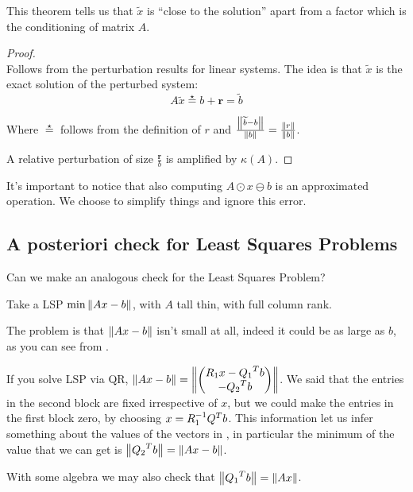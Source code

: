 \documentclass[ComputationalMathematics.tex]{subfiles}
\begin{document}
This theorem tells us that $\widetilde{x}$ is ``close to the solution'' apart from a factor which is the conditioning of matrix $A$.

\begin{proof}~\\
Follows from the perturbation results for linear systems. The idea is that $\widetilde{x}$ is the exact solution of the perturbed system:
\[
  A\widetilde{x} \stareq b + \mathbf{r} = \widetilde{b}
\]

Where $\stareq$ follows from the definition of $r$ and $\frac{\left\lVert\widetilde{b} - b\right\rVert}{\left\lVert b\right\rVert} = \frac{\left\lVert r\right\rVert}{\left\lVert b\right\rVert}$.

  A relative perturbation of size $\frac{\mathbf{r}}{b}$ is amplified by $\kappa(A)$.
\end{proof}

It's important to notice that also computing $A \odot x \ominus b$ is an approximated operation. We choose to simplify things and ignore this error.

\subsection{A posteriori check for Least Squares Problems}
Can we make an analogous check for the Least Squares Problem?

  Take a LSP $\min \left\lVert Ax-b\right\rVert$, with $A$ tall thin, with full column rank.

  The problem is that $\left\lVert Ax - b\right\rVert$ isn't small at all, indeed it could be as large as $b$, as you can see from .


  \begin{obs}
    If you solve LSP via QR, $\left\lVert Ax - b\right\rVert = \left\lVert\begin{pmatrix} 
    R_1 x - {Q_1}^{T}b\\ -{Q_2}^{T} b \end{pmatrix}\right\rVert$. We said that the entries in the second block are fixed irrespective of $x$, but we could make the entries in the first block zero, by choosing $x=R_1^{-1}{Q}^{T}b$. This information let us infer something about the values of the vectors in , in particular the minimum of the value that we can get is $\left\lVert{Q_2}^{T} b\right\rVert = \left\lVert Ax - b\right\rVert$.

    With some algebra we may also check that $\left\lVert{Q_1}^{T} b\right\rVert = \left\lVert Ax\right\rVert$.
  \end{obs}
\end{document}
